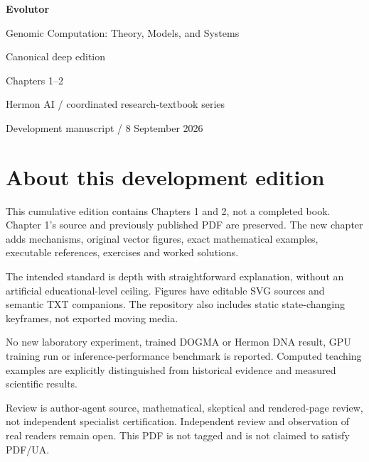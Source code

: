 \documentclass[11pt,oneside,openany]{book}
\begin{document}
\frontmatter
\begin{titlepage}
\color{BookBlue}\sffamily
\vspace*{18mm}
{\Huge\bfseries Evolutor\par}
\vspace{8mm}
{\Large Genomic Computation: Theory, Models, and Systems\par}
\vspace{20mm}
{\large Canonical deep edition\par}
\vspace{5mm}
{\LARGE Chapters 1--2\par}
\vfill
{\normalsize Hermon AI / coordinated research-textbook series\par}
\vspace{6mm}
{\small Development manuscript / 8 September 2026\par}
\end{titlepage}
\chapter*{About this development edition}
This cumulative edition contains Chapters 1 and 2, not a completed book. Chapter 1's source and previously published PDF are preserved. The new chapter adds mechanisms, original vector figures, exact mathematical examples, executable references, exercises and worked solutions.

The intended standard is depth with straightforward explanation, without an artificial educational-level ceiling. Figures have editable SVG sources and semantic TXT companions. The repository also includes static state-changing keyframes, not exported moving media.

No new laboratory experiment, trained DOGMA or Hermon DNA result, GPU training run or inference-performance benchmark is reported. Computed teaching examples are explicitly distinguished from historical evidence and measured scientific results.

Review is author-agent source, mathematical, skeptical and rendered-page review, not independent specialist certification. Independent review and observation of real readers remain open. This PDF is not tagged and is not claimed to satisfy PDF/UA.
\tableofcontents
\mainmatter


\backmatter



\clearpage{}
{}
\printindex
\end{document}
